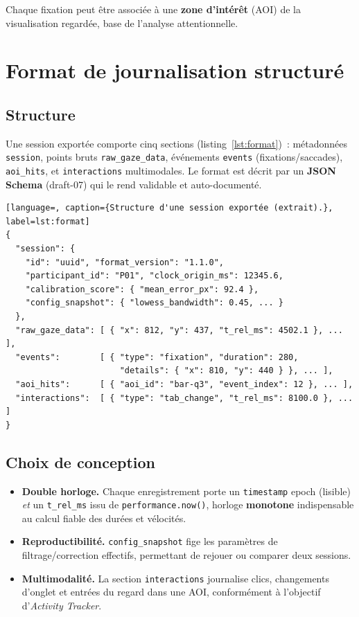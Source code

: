 \documentclass[11pt,a4paper]{article}
\newcommand{\code}[1]{\texttt{\small #1}}
\begin{document}
Chaque fixation peut être associée à une \textbf{zone d'intérêt} (AOI) de la
visualisation regardée, base de l'analyse attentionnelle.

\section{Format de journalisation structuré}

\subsection{Structure}

Une session exportée comporte cinq sections (listing~\ref{lst:format})~: métadonnées
\code{session}, points bruts \code{raw\_gaze\_data}, événements \code{events}
(fixations/saccades), \code{aoi\_hits}, et \code{interactions} multimodales. Le
format est décrit par un \textbf{JSON Schema} (draft-07) qui le rend validable et
auto-documenté.

\begin{lstlisting}[language=, caption={Structure d'une session exportée (extrait).}, label=lst:format]
{
  "session": {
    "id": "uuid", "format_version": "1.1.0",
    "participant_id": "P01", "clock_origin_ms": 12345.6,
    "calibration_score": { "mean_error_px": 92.4 },
    "config_snapshot": { "lowess_bandwidth": 0.45, ... }
  },
  "raw_gaze_data": [ { "x": 812, "y": 437, "t_rel_ms": 4502.1 }, ... ],
  "events":        [ { "type": "fixation", "duration": 280,
                       "details": { "x": 810, "y": 440 } }, ... ],
  "aoi_hits":      [ { "aoi_id": "bar-q3", "event_index": 12 }, ... ],
  "interactions":  [ { "type": "tab_change", "t_rel_ms": 8100.0 }, ... ]
}
\end{lstlisting}

\subsection{Choix de conception}

\begin{itemize}[leftmargin=1.4em]
  \item \textbf{Double horloge.} Chaque enregistrement porte un \code{timestamp}
  epoch (lisible) \emph{et} un \code{t\_rel\_ms} issu de \code{performance.now()},
  horloge \textbf{monotone} indispensable au calcul fiable des durées et vélocités.
  \item \textbf{Reproductibilité.} \code{config\_snapshot} fige les paramètres de
  filtrage/correction effectifs, permettant de rejouer ou comparer deux sessions.
  \item \textbf{Multimodalité.} La section \code{interactions} journalise clics,
  changements d'onglet et entrées du regard dans une AOI, conformément à l'objectif
  d'\textit{Activity Tracker}.
\end{itemize}
\end{document}
